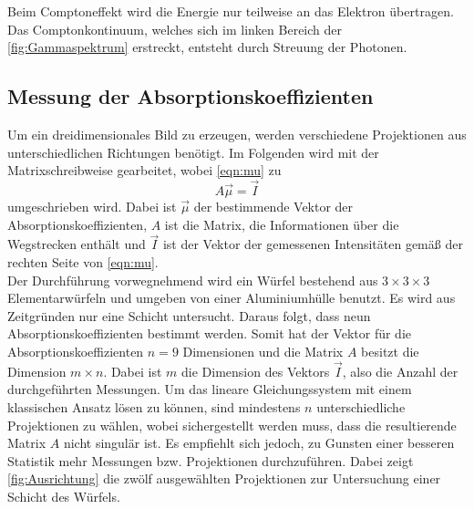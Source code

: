 Beim Comptoneffekt wird die Energie nur teilweise an das Elektron übertragen. Das Comptonkontinuum, welches sich im linken Bereich der
\autoref{fig:Gammaspektrum} erstreckt, entsteht durch Streuung der Photonen.

\subsection{Messung der Absorptionskoeffizienten}
\label{subsec:Absorptionskoeffizient}
Um ein dreidimensionales Bild zu erzeugen, werden verschiedene Projektionen aus unterschiedlichen Richtungen benötigt.
Im Folgenden wird mit der Matrixschreibweise gearbeitet, wobei
\autoref{eqn:mu} zu
\begin{equation}
    A \vec{\mu} = \vec{I}
    \label{eqn:muMatrix}
\end{equation}
umgeschrieben wird. Dabei ist $\vec{\mu}$ der bestimmende Vektor der Absorptionskoeffizienten, $A$ ist die Matrix, die Informationen über die
Wegstrecken enthält und $\vec{I}$ ist der Vektor der gemessenen Intensitäten gemäß der rechten Seite von \autoref{eqn:mu}.\\
Der Durchführung vorwegnehmend wird ein Würfel bestehend aus $3 \times 3 \times 3$ Elementarwürfeln und umgeben von einer Aluminiumhülle benutzt.
Es wird aus Zeitgründen nur eine Schicht untersucht. Daraus folgt, dass neun Absorptionskoeffizienten bestimmt werden.
Somit hat der Vektor für die Absorptionskoeffizienten $n = 9$ Dimensionen und die Matrix $A$ besitzt die 
Dimension $m \times n$. Dabei ist $m$ die Dimension des Vektors $\vec{I}$, also die Anzahl der durchgeführten Messungen.
Um das lineare Gleichungssystem mit einem klassischen Ansatz lösen zu können, sind mindestens $n$ unterschiedliche Projektionen zu wählen,
wobei sichergestellt werden muss, dass die resultierende Matrix $A$ nicht singulär ist. 
Es empfiehlt sich jedoch, zu Gunsten einer besseren Statistik mehr Messungen bzw. Projektionen durchzuführen.
Dabei zeigt \autoref{fig:Ausrichtung} die zwölf ausgewählten Projektionen zur Untersuchung einer Schicht des Würfels.

